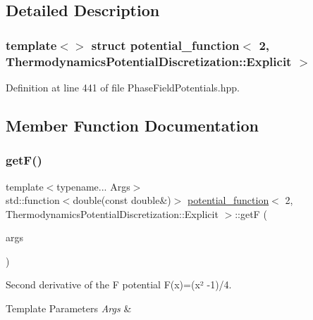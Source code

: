 \subsection{Detailed Description}
\subsubsection*{template$<$$>$\newline
struct potential\+\_\+function$<$ 2, Thermodynamics\+Potential\+Discretization\+::\+Explicit $>$}



Definition at line 441 of file Phase\+Field\+Potentials.\+hpp.



\subsection{Member Function Documentation}
\mbox{\label{structpotential__function_3_012_00_01ThermodynamicsPotentialDiscretization_1_1Explicit_01_4_a67138582a8c51ddeff1c616e8e2b6f0a}} 
\subsubsection{\texorpdfstring{get\+F()}{getF()}}
{\footnotesize\ttfamily template$<$typename... Args$>$ \\
std\+::function$<$double(const double\&)$>$ \hyperlink{structpotential__function}{potential\+\_\+function}$<$ 2, Thermodynamics\+Potential\+Discretization\+::\+Explicit $>$\+::getF (\begin{DoxyParamCaption}\item[{Args...}]{args }\end{DoxyParamCaption})\hspace{0.3cm}{\ttfamily [inline]}}



Second derivative of the F potential F(x)=(x² -\/1)/4. 


\begin{DoxyTemplParams}{Template Parameters}
{\em Args} & \\
\hline
\end{DoxyTemplParams}

